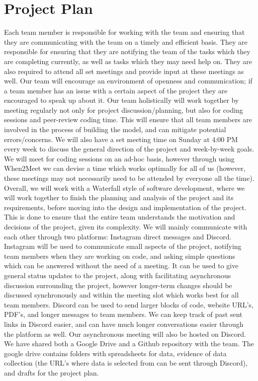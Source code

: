 \documentclass{article} %
\begin{document}
\section {Project Plan}
Each team member is responsible for working with the team and ensuring that they are communicating with the team on a timely and efficient basis. They are responsible for ensuring that they are notifying the team of the tasks which they are completing currently, as well as tasks which they may need help on. They are also required to attend all set meetings and provide input at these meetings as well. Our team will encourage an environment of openness and communication; if a team member has an issue with a certain aspect of the project they are encouraged to speak up about it. Our team holistically will work together by meeting regularly not only for project discussion/planning, but also for coding sessions and peer-review coding time. This will ensure that all team members are involved in the process of building the model, and can mitigate potential errors/concerns. We will also have a set meeting time on Sunday at 4:00 PM every week to discuss the general direction of the project and week-by-week goals. We will meet for coding sessions on an ad-hoc basis, however through using When2Meet we can devise a time which works optimally for all of us (however, these meetings may not necessarily need to be attended by everyone all the time).  Overall, we will work with a Waterfall style of software development, where we will work together to finish the planning and analysis of the project and its requirements, before moving into the design and implementation of the project. This is done to ensure that the entire team understands the motivation and decisions of the project, given its complexity. 
We will mainly communicate with each other through two platforms: Instagram direct messages and Discord. Instagram will be used to communicate small aspects of the project, notifying team members when they are working on code, and asking simple questions which can be answered without the need of a meeting. It can be used to give general status updates to the project, along with facilitating asynchronous discussion surrounding the project, however longer-term changes should be discussed synchronously and within the meeting slot which works best for all team members. Discord can be used to send larger blocks of code, website URL’s, PDF’s, and longer messages to team members. We can keep track of past sent links in Discord easier, and can have much longer conversations easier through the platform as well. Our asynchronous meeting will also be hosted on Discord. We have shared both a Google Drive and a Github repository with the team. The google drive contains folders with spreadsheets for data, evidence of data collection (the URL’s where data is selected from can be sent through Discord), and drafts for the project plan. 
\end{document}
